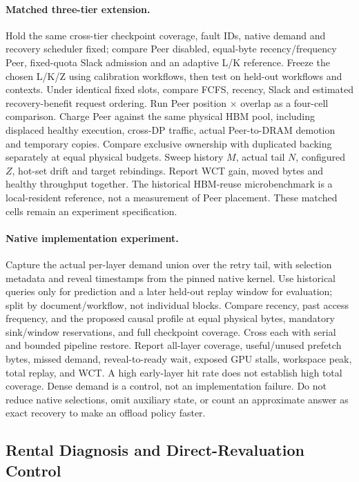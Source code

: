 \documentclass[sigplan,10pt,anonymous,nonacm]{acmart}
\begin{document}
\paragraph{Matched three-tier extension.}
Hold the same cross-tier checkpoint coverage, fault IDs, native demand
and recovery scheduler fixed; compare Peer disabled, equal-byte
recency/frequency Peer, fixed-quota Slack admission and an adaptive L/K
reference. Freeze the chosen L/K/Z using calibration workflows, then test
on held-out workflows and contexts. Under identical fixed slots, compare
FCFS, recency, Slack and estimated recovery-benefit request ordering.
Run Peer position $\times$ overlap as a four-cell comparison. Charge
Peer against the same physical HBM pool, including displaced healthy
execution, cross-DP traffic, actual Peer-to-DRAM demotion and temporary
copies. Compare exclusive ownership with duplicated backing separately
at equal physical budgets. Sweep history $M$, actual tail $N$, configured
$Z$, hot-set drift and target rebindings. Report WCT gain, moved bytes and
healthy throughput together. The historical HBM-reuse microbenchmark is
a local-resident reference, not a measurement of Peer placement. These
matched cells remain an experiment specification.

\paragraph{Native implementation experiment.}
Capture the actual per-layer demand union over the retry tail, with
selection metadata and reveal timestamps from the pinned native kernel.
Use historical queries only for prediction and a later held-out replay
window for evaluation; split by document/workflow, not individual blocks.
Compare recency, past access frequency, and the proposed causal profile
at equal physical bytes, mandatory sink/window reservations, and full
checkpoint coverage. Cross each with serial and bounded pipeline restore.
Report all-layer coverage, useful/unused prefetch bytes, missed demand,
reveal-to-ready wait, exposed GPU stalls, workspace peak, total replay,
and WCT. A high early-layer hit rate does not establish high total
coverage. Dense demand is a control, not an implementation failure.
Do not reduce native selections, omit auxiliary state, or count an
approximate answer as exact recovery to make an offload policy faster.

\FloatBarrier
\subsection{Rental Diagnosis and Direct-Revaluation Control}
\label{sec:eval-rental}
\end{document}
